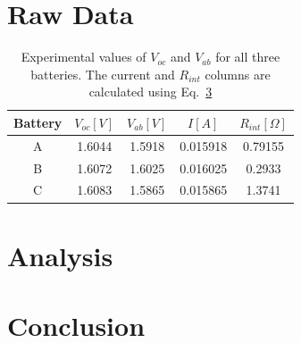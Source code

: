 \documentclass{report}
\begin{document}
\section{Raw Data}
\begin{table}
    \begin{center}
    \caption{Experimental values of $V_{oc}$ and $V_{ab}$ for all three batteries. The current and $R_{int}$ columns are calculated using Eq.~\ref{}}
    \begin{tabular}{|c c c c c|}
        \hline
        Battery & $V_{oc} [V]$ & $V_{ab} [V]$ & $ I[A]$ & $R_{int} [\Omega]$\\
        \hline
        A      &   1.6044    &  1.5918     &  0.015918     &  0.79155 \\
        B   & 1.6072    & 1.6025 &  0.016025 & 0.2933 \\
        C   & 1.6083    & 1.5865    & 0.015865  & 1.3741 \\
        \hline

    \end{tabular}
    \end{center}
    \end{table}
\section{Analysis}

\section{Conclusion}
\end{document}
